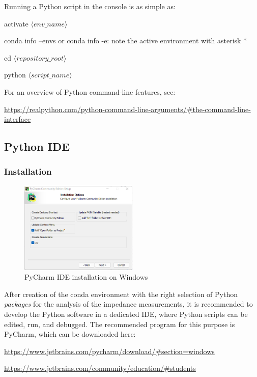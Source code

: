 Running a Python script in the console is as simple as:

\textsf{activate $\langle env\_name \rangle$}

\textsf{conda info --envs} or \textsf{conda info -e}: note the active environment with asterisk *

\textsf{cd $\langle repository\_root \rangle$}

\textsf{python $\langle script\_name \rangle$}

For an overview of Python command-line features, see:

\url{https://realpython.com/python-command-line-arguments/#the-command-line-interface}

\subsection{Python IDE}
\label{appendix:ide}

\subsubsection{Installation}

\begin{figure}[H]
	\centering
	\includegraphics[width=0.5\textwidth]{Figures/PyCharm_checks.png}
	\caption{PyCharm IDE installation on Windows}
	\label{fig:PyCharm}
\end{figure}

After creation of the \textsf{conda} environment with the right selection of Python \emph{packages} for the analysis of the impedance measurements, it is recommended to develop the Python software in a dedicated IDE, where Python scripts can be edited, run, and debugged. The recommended program for this purpose is PyCharm, which can be downloaded here: 

\url{https://www.jetbrains.com/pycharm/download/#section=windows}

\url{https://www.jetbrains.com/community/education/#students}

